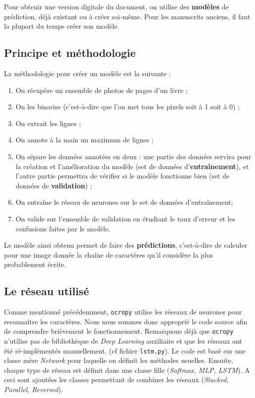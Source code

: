\documentclass{report}
\begin{document}
Pour obtenir une version digitale du document, on utilise des \textbf{modèles} de prédiction, déjà existant ou à créer soi-même.
Pour les manuscrits anciens, il faut la plupart du temps créer son modèle. %

\subsection{Principe et méthodologie}

La méthodologie pour créer un modèle est la suivante :

\begin{enumerate}[parsep=0.1cm,itemsep=0.1cm]
    \item On récupère un ensemble de photos de pages d'un livre ;
    \item On les binarise (c'est-à-dire que l'on met tous les pixels soit à 1 soit à 0) ;
    \item On extrait les lignes ;
    \item On annote à la main un maximum de lignes ;
    \item On sépare les données annotées en deux : une partie des données servira pour la création et l'amélioration du modèle (set de données d'\textbf{entraînement}), et l'autre partie permettra de vérifier si le modèle fonctionne bien (set de données de \textbf{validation}) ;
    \item On entraîne le réseau de neurones sur le set de données d'entraînement;
    \item On valide sur l'ensemble de validation en étudiant le taux d'erreur et les confusions faites par le modèle.
\end{enumerate}

Le modèle ainsi obtenu permet de faire des \textbf{prédictions}, c'est-à-dire de calculer pour une image donnée la chaîne de caractères qu'il considère la plus probablement écrite.

\subsection{Le réseau utilisé}

Comme mentionné précédemment, \texttt{ocropy} utilise les réseaux de neurones pour reconnaître les caractères. Nous nous sommes donc approprié le code source afin de comprendre brièvement le fonctionnement. Remarquons déjà que \texttt{ocropy} n'utilise pas de bibliothèque de \textit{Deep Learning} auxiliaire et que les réseaux ont été ré-implémentés manuellement. (cf fichier \texttt{lstm.py}). Le code est basé sur une classe mère \textit{Network} pour laquelle on définit les méthodes usuelles. Ensuite, chaque type de réseau est définit dans une classe fille (\textit{Softmax, MLP, LSTM}). A ceci sont ajoutées les classes permettant de combiner les réseaux (\textit{Stacked, Parallel, Reversed}). \\
\end{document}
